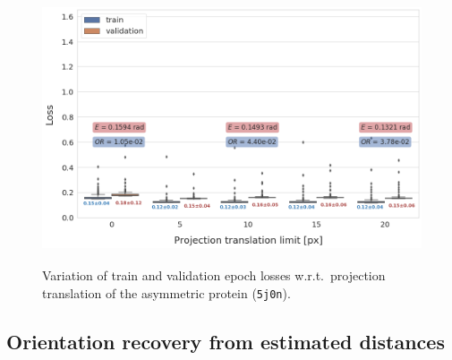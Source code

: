 \begin{figure}
    \centering
        \includegraphics[height=8cm]{images/de_translation_nums.png}
        \caption{
        Variation of train and validation epoch losses w.r.t.\ projection translation of the asymmetric protein (\texttt{5j0n}).
    }\label{fig:distance-estimation-vary-projection-translation}
\end{figure}

\subsection{Orientation recovery from estimated distances}


